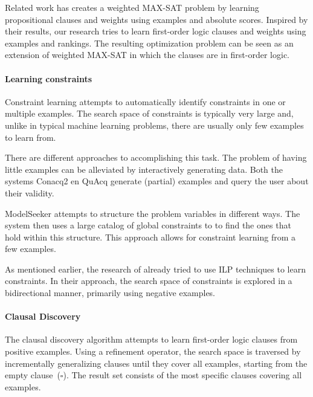 \documentclass[letterpaper]{article}
\theoremstyle{definition}
\begin{document}
Related work \cite{campigotto2011active} has creates a weighted MAX-SAT problem by learning propositional clauses and weights using examples and absolute scores.
Inspired by their results, our research tries to learn first-order logic clauses and weights using examples and rankings.
The resulting optimization problem can be seen as an extension of weighted MAX-SAT in which the clauses are in first-order logic.

\paragraph{Learning constraints}
Constraint learning attempts to automatically identify constraints in one or multiple examples.
The search space of constraints is typically very large and, unlike in typical machine learning problems, there are usually only few examples to learn from.

There are different approaches to accomplishing this task.
The problem of having little examples can be alleviated by interactively generating data.
Both the systems Conacq2 \cite{bessiere2007query} en QuAcq \cite{bessiere2013constraint} generate (partial) examples and query the user about their validity.

ModelSeeker \cite{Beldiceanu:ModelSeeker} attempts to structure the problem variables in different ways.
The system then uses a large catalog of global constraints to to find the ones that hold within this structure. 
This approach allows for constraint learning from a few examples.

As mentioned earlier, the research of \cite{Lallouet:LearningCP} already tried to use ILP techniques to learn constraints.
In their approach, the search space of constraints is explored in a bidirectional manner, primarily using negative examples.

\paragraph{Clausal Discovery}
The clausal discovery algorithm \cite{DeRaedt:ClausalDiscovery} attempts to learn first-order logic clauses from positive examples.
Using a refinement operator, the search space is traversed by incrementally generalizing clauses until they cover all examples, starting from the empty clause~($\square$).
The result set consists of the most specific clauses covering all examples.

\end{document}
